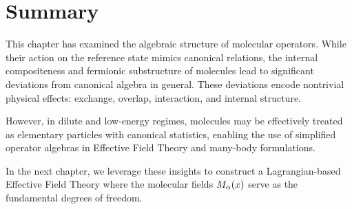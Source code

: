 \section{Summary}

This chapter has examined the algebraic structure of molecular operators. While their action on the reference state mimics canonical relations, the internal compositeness and fermionic substructure of molecules lead to significant deviations from canonical algebra in general. These deviations encode nontrivial physical effects: exchange, overlap, interaction, and internal structure.

However, in dilute and low-energy regimes, molecules may be effectively treated as elementary particles with canonical statistics, enabling the use of simplified operator algebras in Effective Field Theory and many-body formulations.

In the next chapter, we leverage these insights to construct a Lagrangian-based Effective Field Theory where the molecular fields \(M_\alpha(x)\) serve as the fundamental degrees of freedom.

